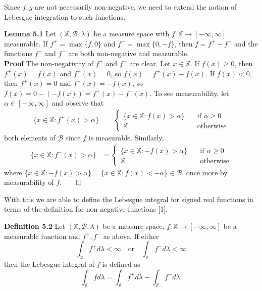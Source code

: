 \documentclass[11pt, letterpaper]{article}
\newcommand{\mbb}[1]{\mathbb{#1}}
\newcommand{\mc}[1]{\mathcal{#1}}
\begin{document}
    Since $f,g$ are not necessarily non-negative, we need to extend the notion of Lebesgue integration to such functions.
    \begin{center}
        \begin{minipage}[c]{0.85\linewidth}
            {\bf Lemma 5.1} Let $(\mbb{X},\mc{B},\lambda)$ be a measure space with $f:\mbb{X}\rightarrow[-\infty,\infty]$ measurable. If $f^+=\max\{f,0\}$ and $f^-=\max\{0,-f\}$, then
            $f=f^+-f^-$ and the functions $f^+$ and $f^-$ are both non-negative and measurable. \\[10pt]
            {\bf Proof} The non-negativity of $f^+$ and $f^-$ are clear. Let $x\in \mbb{X}$. If $f(x)\geq 0$, then $f^+(x)=f(x)$ and $f^-(x)=0$, so $f(x)=f^+(x)-f(x)$. If $f(x)<0$, then $f^+(x)=0$ and $f^-(x)=-f(x)$, so $f(x)=0-(-f(x))=f^+(x)-f^-(x)$. To see measurability, let $\alpha\in[-\infty,\infty]$ and observe that
            \begin{align*}
                \{x\in\mbb{X}:f^+(x)>\alpha\}&=\begin{cases}
                    \{x\in\mbb{X}:f(x)>\alpha\}\quad&\text{if $\alpha\geq 0$}\\
                    \mbb{X}\quad&\text{otherwise}
                \end{cases}
            \end{align*}
            both elements of $\mc{B}$ since $f$ is measurable. Similarly,
            \begin{align*}
                \{x\in\mbb{X}:f^-(x)>\alpha\}&=\begin{cases}
                    \{x\in\mbb{X}:-f(x)>\alpha\}\quad&\text{if $\alpha\geq 0$}\\
                    \mbb{X}\quad&\text{otherwise}
                \end{cases}
            \end{align*}
            where $\{x\in\mbb{X}:-f(x)>\alpha\}=\{x\in\mbb{X}:f(x)<-\alpha\}\in\mc{B}$, once more by measurability of $f$.\hfill{$\qed$}
        \end{minipage}
    \end{center}\vspace{10pt}
    With this we are able to define the Lebesgue integral for signed real functions in terms of the definition for non-negative functions [1].
    \begin{center}
        \begin{minipage}[c]{0.85\linewidth}
            {\bf Definition 5.2} Let $(\mbb{X},\mc{B},\lambda)$ be a measure space, $f:\mbb{X}\rightarrow[-\infty,\infty]$ be a measurable function and $f^+,f^-$ as above. If either
            \[\int_\mbb{X}f^+d\lambda<\infty\quad\text{or}\quad\int_\mbb{X}f^-d\lambda<\infty\]
            then the Lebesgue integral of $f$ is defined as
            \[\int_\mbb{X}fd\lambda=\int_\mbb{X}f^+d\lambda-\int_\mbb{X}f^-d\lambda.\] 
        \end{minipage}
    \end{center}\vspace{10pt}
\end{document}
